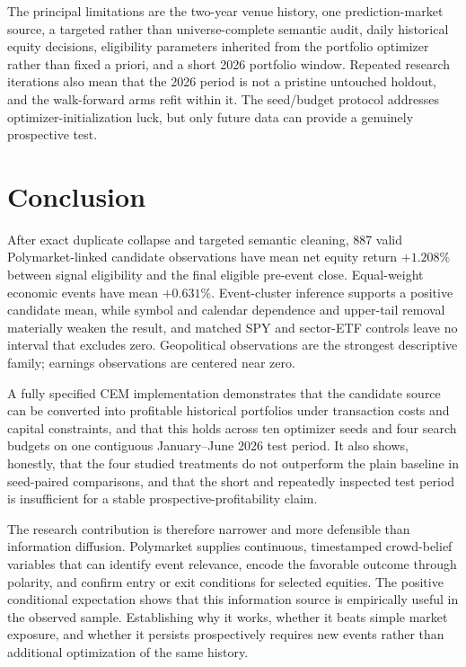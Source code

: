 \documentclass[sigconf,anonymous]{acmart}
\begin{document}
The principal limitations are the two-year venue history, one prediction-market source, a targeted rather than universe-complete semantic audit, daily historical equity decisions, eligibility parameters inherited from the portfolio optimizer rather than fixed a priori, and a short 2026 portfolio window. Repeated research iterations also mean that the 2026 period is not a pristine untouched holdout, and the walk-forward arms refit within it. The seed/budget protocol addresses optimizer-initialization luck, but only future data can provide a genuinely prospective test.

\section{Conclusion}

After exact duplicate collapse and targeted semantic cleaning, 887 valid Polymarket-linked candidate observations have mean net equity return $+1.208\%$ between signal eligibility and the final eligible pre-event close. Equal-weight economic events have mean $+0.631\%$. Event-cluster inference supports a positive candidate mean, while symbol and calendar dependence and upper-tail removal materially weaken the result, and matched SPY and sector-ETF controls leave no interval that excludes zero. Geopolitical observations are the strongest descriptive family; earnings observations are centered near zero.

A fully specified CEM implementation demonstrates that the candidate source can be converted into profitable historical portfolios under transaction costs and capital constraints, and that this holds across ten optimizer seeds and four search budgets on one contiguous January--June 2026 test period. It also shows, honestly, that the four studied treatments do not outperform the plain baseline in seed-paired comparisons, and that the short and repeatedly inspected test period is insufficient for a stable prospective-profitability claim.

The research contribution is therefore narrower and more defensible than information diffusion. Polymarket supplies continuous, timestamped crowd-belief variables that can identify event relevance, encode the favorable outcome through polarity, and confirm entry or exit conditions for selected equities. The positive conditional expectation shows that this information source is empirically useful in the observed sample. Establishing why it works, whether it beats simple market exposure, and whether it persists prospectively requires new events rather than additional optimization of the same history.
\end{document}
